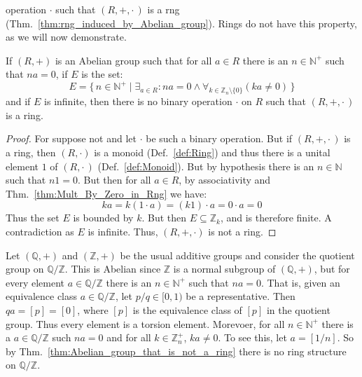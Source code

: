         operation $\cdot$ such that $(R,+,\cdot\,)$ is a rng
        (Thm.~\ref{thm:rng_induced_by_Abelian_group}). Rings do not have this
        property, as we will now demonstrate.
        \begin{theorem}
            \label{thm:Abelian_group_that_is_not_a_ring}%
            If $(R,+)$ is an Abelian group such that for all $a\in{R}$ there is
            an $n\in\mathbb{N}^{+}$ such that $na=0$, if $E$ is the set:
            \begin{equation}
                E=\{\,n\in\mathbb{N}^{+}\;|
                    \;\exists_{a\in{R}}:na=0\land
                    \forall_{k\in\mathbb{Z}_{n}\setminus\{0\}}(ka\ne{0})\,\}
            \end{equation}
            and if $E$ is infinite, then there is no binary operation $\cdot$ on
            $R$ such that $(R,+,\cdot\,)$ is a ring.
        \end{theorem}
        \begin{proof}
            For suppose not and let $\cdot$ be such a binary operation. But if
            $(R,+,\cdot\,)$ is a ring, then $(R,\cdot)$ is a monoid
            (Def.~\ref{def:Ring}) and thus there is a unital element $1$ of
            $(R,\cdot\,)$ (Def.~\ref{def:Monoid}). But by hypothesis there is an
            $n\in\mathbb{N}$ such that $n1=0$. But then for all $a\in{R}$, by
            associativity and Thm.~\ref{thm:Mult_By_Zero_in_Rng} we have:
            \begin{equation}
                ka=k(1\cdot{a})=(k1)\cdot{a}=0\cdot{a}=0
            \end{equation}
            Thus the set $E$ is bounded by $k$. But then
            $E\subseteq\mathbb{Z}_{k}$, and is therefore finite. A contradiction
            as $E$ is infinite. Thus, $(R,+,\cdot)$ is not a ring.
        \end{proof}
        \begin{example}
            Let $(\mathbb{Q},+)$ and $(\mathbb{Z},+)$ be the usual additive
            groups and consider the quotient group on $\mathbb{Q}/\mathbb{Z}$.
            This is Abelian since $\mathbb{Z}$ is a normal subgroup of
            $(\mathbb{Q},+)$, but for every element $a\in\mathbb{Q}/\mathbb{Z}$
            there is an $n\in\mathbb{N}^{+}$ such that $na=0$. That is, given an
            equivalence class $a\in\mathbb{Q}/\mathbb{Z}$, let $p/q\in[0,1)$ be
            a representative. Then $qa=[p]=[0]$, where $[p]$ is the equivalence
            class of $[p]$ in the quotient group. Thus every element is a
            torsion element. Morevoer, for all $n\in\mathbb{N}^{+}$ there is a
            $a\in\mathbb{Q}/\mathbb{Z}$ such $na=0$ and for all
            $k\in\mathbb{Z}_{n}^{+}$, $ka\ne{0}$. To see this, let
            $a=[1/n]$. So by Thm.~\ref{thm:Abelian_group_that_is_not_a_ring}
            there is no ring structure on $\mathbb{Q}/\mathbb{Z}$.
        \end{example}